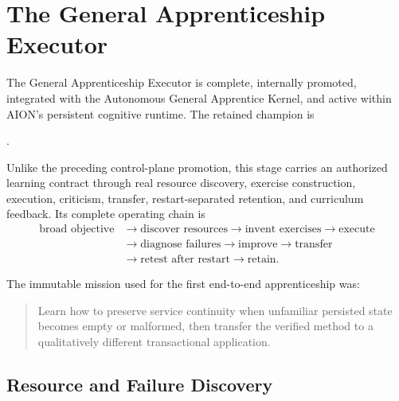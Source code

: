 
\section{The General Apprenticeship Executor}
\label{sec:aion-general-apprenticeship-executor}

The General Apprenticeship Executor is complete, internally promoted,
integrated with the Autonomous General Apprentice Kernel, and active within
AION's persistent cognitive runtime.  The retained champion is
\begin{center}
\small{}.
\end{center}
Unlike the preceding control-plane promotion, this stage carries an authorized
learning contract through real resource discovery, exercise construction,
execution, criticism, transfer, restart-separated retention, and curriculum
feedback.  Its complete operating chain is
\begin{equation}
\begin{aligned}
\text{broad objective}
&\rightarrow \text{discover resources}
\rightarrow \text{invent exercises}
\rightarrow \text{execute} \\
&\rightarrow \text{diagnose failures}
\rightarrow \text{improve}
\rightarrow \text{transfer} \\
&\rightarrow \text{retest after restart}
\rightarrow \text{retain}.
\end{aligned}
\label{eq:general-apprenticeship-executor-chain}
\end{equation}

The immutable mission used for the first end-to-end apprenticeship was:
\begin{quote}
Learn how to preserve service continuity when unfamiliar persisted state
becomes empty or malformed, then transfer the verified method to a
qualitatively different transactional application.
\end{quote}

\subsection{Resource and Failure Discovery}
\label{subsec:apprenticeship-resource-discovery}

